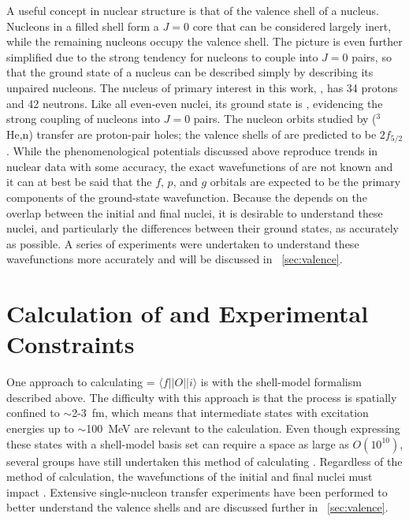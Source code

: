 A useful concept in nuclear structure is that of the valence shell of a nucleus.  Nucleons in a filled shell form a $J=0$ core that can be considered largely inert, while the remaining nucleons occupy the valence shell.  The picture is even further simplified due to the strong tendency for nucleons to couple into $J=0$ pairs, so that the ground state of a nucleus can be described simply by describing its unpaired nucleons.  The nucleus of primary interest in this work, , has 34 protons and 42 neutrons.  Like all even-even nuclei, its ground state is \zp, evidencing the strong coupling of nucleons into $J=0$ pairs.  The nucleon orbits studied by ($^3$He,n) transfer are proton-pair holes; the valence shells of \GeTargets are predicted to be $2f_{5/2}$.  While the phenomenological potentials discussed above reproduce trends in nuclear data with some accuracy, the exact wavefunctions of \SeProducts are not known and it can at best be said that the $f$, $p$, and $g$ orbitals are expected to be the primary components of the ground-state wavefunction.  Because the \NME depends on the overlap between the initial and final nuclei, it is desirable to understand these nuclei, and particularly the differences between their ground states, as accurately as possible.  A series of experiments were undertaken to understand these wavefunctions more accurately and will be discussed in {\sect}~\ref{sec:valence}.

\section{Calculation of \NME and Experimental Constraints}

One approach to calculating \NME = $\langle f||O||i \rangle$ is with the shell-model formalism described above.  The difficulty with this approach is that the \zvbb process is spatially confined to $\sim$2-3~fm, which means that intermediate states with excitation energies up to $\sim$100~MeV \citep{anatomy} are relevant to the calculation.  Even though expressing these states with a shell-model basis set can require a space as large as $O(10^{10})$,  several groups have still undertaken this method of calculating \NME \citep{CaurierShellModel}.  Regardless of the method of calculation, the wavefunctions of the initial and final nuclei must impact \NME.  Extensive single-nucleon transfer experiments have been performed to better understand the valence shells and are discussed further in {\sect}~\ref{sec:valence}.

